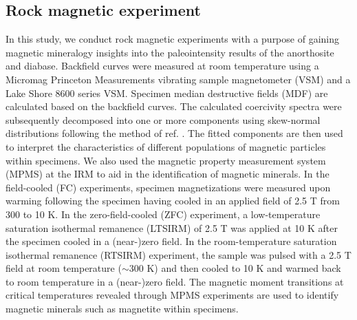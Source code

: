 \documentclass[9pt,twocolumn,twoside,lineno]{pnas-new}
\begin{document}
{%


\subsection*{Rock magnetic experiment}

In this study, we conduct rock magnetic experiments with a purpose of gaining magnetic mineralogy insights into the paleointensity results of the anorthosite and diabase. Backfield curves were measured at room temperature using a Micromag Princeton Measurements vibrating sample magnetometer (VSM) and a Lake Shore 8600 series VSM. Specimen median destructive fields (MDF) are calculated based on the backfield curves. The calculated coercivity spectra were subsequently decomposed into one or more components using skew-normal distributions following the method of ref. \citealp{Maxbauer2016a}. The fitted components are then used to interpret the characteristics of different populations of magnetic particles within specimens. We also used the magnetic property measurement system (MPMS) at the IRM to aid in the identification of magnetic minerals. In the field-cooled (FC) experiments, specimen magnetizations were measured upon warming following the specimen having cooled in an applied field of 2.5 T from 300 to 10 K. In the zero-field-cooled (ZFC) experiment, a low-temperature saturation isothermal remanence (LTSIRM) of 2.5 T was applied at 10 K after the specimen cooled in a (near-)zero field. In the room-temperature saturation isothermal remanence (RTSIRM) experiment, the sample was pulsed with a 2.5 T field at room temperature ($\sim$300 K) and then cooled to 10 K and warmed back to room temperature in a (near-)zero field. The magnetic moment transitions at critical temperatures revealed through MPMS experiments are used to identify magnetic minerals such as magnetite \cite{Verwey1939a} within specimens. 

}
\end{document}
